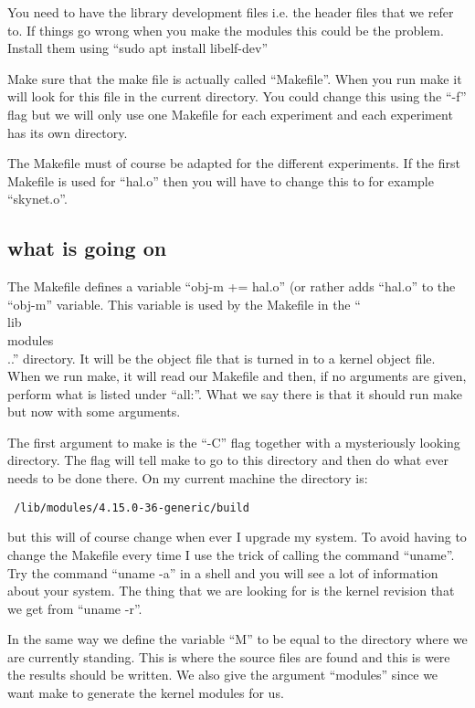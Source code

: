 \documentclass[a4paper,11pt]{article}
\begin{document}
You need to have the library development files i.e. the header files
that we refer to. If things go wrong when you make the modules this
could be the problem. Install them using ``sudo apt install libelf-dev''

Make sure that the make file is actually called ``Makefile''. When you
run make it will look for this file in the current directory. You
could change this using the ``-f'' flag but we will only use one
Makefile for each experiment and each experiment has its own directory. 

The Makefile must of course be adapted for the different
experiments. If the first Makefile is used for ``hal.o'' then you will
have to change this to for example ``skynet.o''.

\subsection*{what is going on}

The Makefile defines a variable ``obj-m += hal.o'' (or rather adds
``hal.o'' to the ``obj-m'' variable. This variable is used by the
Makefile in the ``\\lib\\modules\\..'' directory. It will be the object
file that is turned in to a kernel object file. When we run make, it
will read our Makefile and then, if no arguments are given, perform
what is listed under ``all:''. What we say there is that it should run
make but now with some arguments.

The first argument to make is the ``-C'' flag together with a
mysteriously looking directory. The flag will tell make to go to this
directory and then do what ever needs to be done there. On my current
machine the directory is:

\begin{verbatim}
 /lib/modules/4.15.0-36-generic/build
\end{verbatim}

but this will of course change when ever I upgrade my system. To
avoid having to change the Makefile every time I use the trick of
calling the command ``uname''. Try the command ``uname -a'' in a shell
and you will see a lot of information about your system. The thing
that we are looking for is the kernel revision that we get from ``uname -r''.

In the same way we define the variable ``M'' to be equal to the
directory where we are currently standing. This is where the source
files are found and this is were the results should be written. We
also give the argument ``modules'' since we want make to
generate the kernel modules for us. 
\end{document}
